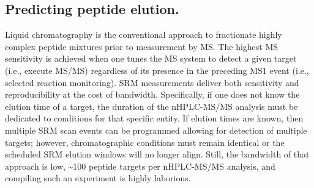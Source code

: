 \subsection*{Predicting peptide elution.}

Liquid chromatography is the conventional approach to fractionate highly complex peptide mixtures prior to measurement by MS. The highest MS sensitivity is achieved when one tunes the MS system to detect a given target (i.e., execute MS/MS) regardless of its presence in the preceding MS1 event (i.e., selected reaction monitoring). SRM measurements deliver both sensitivity and reproducibility at the cost of bandwidth. Specifically, if one does not know the elution time of a target, the duration of the nHPLC-MS/MS analysis must be dedicated to conditions for that specific entity. If elution times are known, then multiple SRM scan events can be programmed allowing for detection of multiple targets; however, chromatographic conditions must remain identical or the scheduled SRM elution windows will no longer align. Still, the bandwidth of that approach is low, \textasciitilde100 peptide targets per nHPLC-MS/MS analysis, and compiling such an experiment is highly laborious.\cite{indexion}

